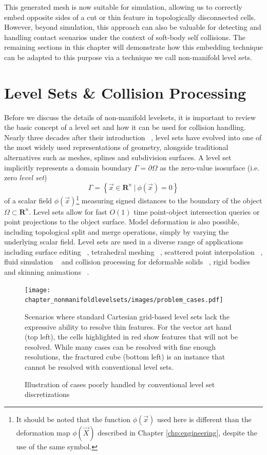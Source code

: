 This generated mesh is now suitable for simulation, allowing us to
correctly embed opposite sides of a cut or thin feature in
topologically disconnected cells. However, beyond simulation, this
approach can also be valuable for detecting and handling contact
scenarios under the context of soft-body self collisions. The
remaining sections in this chapter will demonstrate how this embedding
technique can be adapted to this purpose via a technique we call
non-manifold level sets.

\section{Level Sets \& Collision Processing}
Before we discuss the details of non-manifold levelsets, it is
important to review the basic concept of a level set and how it can be
used for collision handling. Nearly three decades after their
introduction ~\citep{OsherS:1988}, level sets have evolved into one of
the most widely used representations of geometry, alongside
traditional alternatives such as meshes, splines and subdivision
surfaces. A level set implicitly represents a domain boundary
$\Gamma=\partial\Omega$ as the zero-value isosurface (i.e. zero
\emph{level set})
\begin{equation}
\Gamma=\left\{\vec{x}\in\mathbf{R}^n\ |\ \phi(\vec{x})=0\right\}
\label{eqn:definition}
\end{equation}
of a scalar field $\phi(\vec{x})$\footnote{It should be noted that the
function $\phi(\vec{x})$ used here is different than the deformation
map $\phi(\vec{X})$ described in Chapter \ref{chp:engineering},
despite the use of the same symbol.} measuring signed distances to the
boundary of the object $\Omega\subset\mathbf{R}^n$. Level sets allow
for fast $O(1)$ time point-object intersection queries or point
projections to the object surface. Model deformation is also possible,
including topological split and merge operations, simply by varying
the underlying scalar field. Level sets are used in a diverse range of
applications including surface editing ~\citep{MusetBWB:2002},
tetrahedral meshing ~\citep{LabelS:2007}, scattered point interpolation
~\citep{ZhaoOF:2001}, fluid simulation ~\citep{OsherF:2002} and collision
processing for deformable solids ~\citep{Gascu:1993}, rigid bodies
~\citep{GuendBF:2003} and skinning animations ~\citep{VaillBGCRWGP:2013}.


\begin{figure}
  \centering
\texttt{[image: chapter\_nonmanifoldlevelsets/images/problem\_cases.pdf]}

\caption{Illustration of cases poorly handled by conventional level
  set discretizations} {Scenarios where standard Cartesian grid-based
  level sets lack the expressive ability to resolve thin features. For
  the vector art hand (top left), the cells highlighted in red show
  features that will not be resolved. While many cases can be resolved
  with fine enough resolutions, the fractured cube (bottom left) is an
  instance that cannot be resolved with conventional level sets.}
\label{fig:underresolved}
\end{figure}


